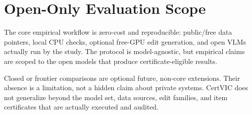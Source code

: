 \section{Open-Only Evaluation Scope}

The core empirical workflow is zero-cost and reproducible: public/free data
pointers, local CPU checks, optional free-GPU edit generation, and open VLMs
actually run by the study. The protocol is model-agnostic, but empirical claims
are scoped to the open models that produce certificate-eligible results.

Closed or frontier comparisons are optional future, non-core extensions. Their
absence is a limitation, not a hidden claim about private systems. CertVIC does
not generalize beyond the model set, data sources, edit families, and item
certificates that are actually executed and audited.
